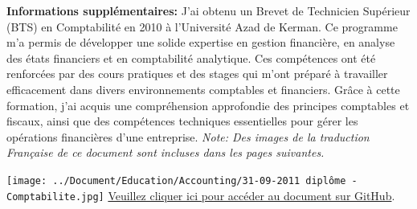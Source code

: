 \documentclass{article}
\begin{document}
    \par\textbf{Informations supplémentaires:} J'ai obtenu un Brevet de Technicien Supérieur (BTS) en Comptabilité en 2010 à l'Université Azad de Kerman. Ce programme m'a permis de développer une solide expertise en gestion financière, en analyse des états financiers et en comptabilité analytique. Ces compétences ont été renforcées par des cours pratiques et des stages qui m'ont préparé à travailler efficacement dans divers environnements comptables et financiers. Grâce à cette formation, j'ai acquis une compréhension approfondie des principes comptables et fiscaux, ainsi que des compétences techniques essentielles pour gérer les opérations financières d'une entreprise.
    \newline
    \newline
    \textit {Note: Des images de la traduction Française de ce document sont incluses dans les pages suivantes.}

        \begin{center}
            \texttt{[image: ../Document/Education/Accounting/31-09-2011 diplôme - Comptabilite.jpg]}
            \footnotesize
            \href{https://github.com/jafarizadeh/CV---lettre/tree/079f60796b41475881d7ba4a70abc3254d3dd466/Document/Education/Accounting}{Veuillez cliquer ici pour accéder au document sur GitHub}.
        \end{center}
\end{document}
